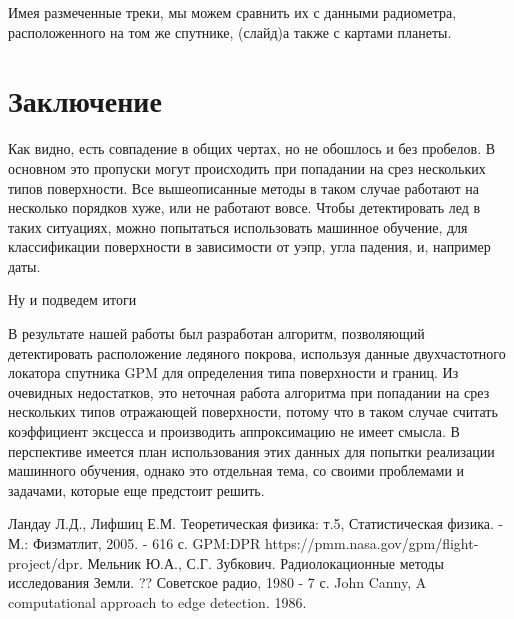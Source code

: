 Имея размеченные треки, мы можем сравнить их с данными радиометра, расположенного на том же спутнике, (слайд)а также с
картами планеты.

\section{Заключение}
Как видно, есть совпадение в общих чертах, но не обошлось и без пробелов. В основном это пропуски могут происходить при
попадании на срез нескольких типов поверхности. Все вышеописанные методы в таком случае работают на несколько порядков
хуже, или не работают вовсе. Чтобы детектировать лед в таких ситуациях, можно попытаться использовать машинное обучение,
для классификации поверхности в зависимости от уэпр, угла падения, и, например даты.

Ну и подведем итоги

В результате нашей работы был разработан алгоритм, позволяющий детектировать расположение ледяного покрова, используя
данные двухчастотного локатора спутника GPM для определения типа поверхности и границ.
Из очевидных недостатков, это неточная работа алгоритма при попадании на срез нескольких типов отражающей поверхности,
потому что в таком случае считать коэффициент эксцесса и производить аппроксимацию не имеет смысла. 
В перспективе имеется план использования этих данных для попытки реализации машинного обучения, однако это отдельная
тема, со своими проблемами и задачами, которые еще предстоит решить. 


\newpage
{}
\begin{thebibliography}{99}
 Ландау Л.Д., Лифшиц Е.М. Теоретическая физика: т.5, Статистическая физика. - М.: Физматлит, 2005. - 616 с.
 GPM:DPR https://pmm.nasa.gov/gpm/flight-project/dpr.
 Мельник Ю.А., С.Г. Зубкович. Радиолокационные методы исследования Земли. ?? Советское радио, 1980 - 7 с.
 John Canny, A computational approach to edge detection. 1986.
\end{thebibliography}

